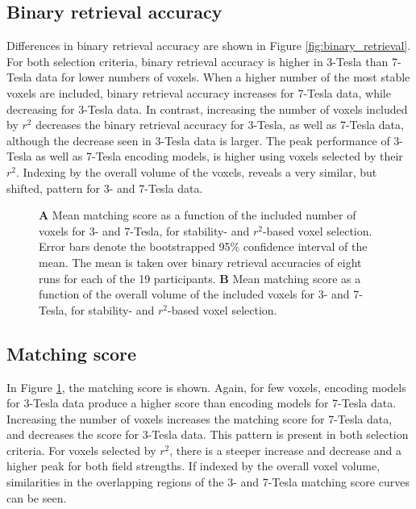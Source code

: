 \subsection*{Binary retrieval accuracy}

Differences in binary retrieval accuracy are shown in Figure \ref{fig:binary_retrieval}. For both selection criteria, binary retrieval
accuracy is higher in 3-Tesla than 7-Tesla data for lower numbers of voxels.
When a higher number of the most stable voxels are included, binary retrieval accuracy increases for 7-Tesla data, while decreasing for 3-Tesla data.    
In contrast, increasing the number of voxels included by $r^2$ decreases the
binary retrieval accuracy for 3-Tesla, as well as 7-Tesla data, although the
decrease seen in 3-Tesla data is larger. The peak
performance of 3-Tesla as well as 7-Tesla encoding models, is higher using
voxels selected by their $r^2$.
Indexing by the overall volume of the voxels, reveals a very similar, but
shifted, pattern for 3- and 7-Tesla data.

\begin{figure}
  \centering
  \def\svgwidth{\linewidth}
  
	
  \caption{\textbf{A} Mean matching score as a function of the included number of
  voxels for 3- and 7-Tesla, for stability- and $r^2$-based voxel selection. Error bars denote the bootstrapped 95\% confidence
  interval of the mean. The mean is taken over binary retrieval accuracies of
  eight runs for each of the 19 participants. \textbf{B} Mean matching score as a function of the overall volume of
	  the included voxels for 3- and 7-Tesla, for stability- and $r^2$-based voxel selection.}

 \label{fig:matching_score}
\end{figure}

\subsection*{Matching score}

In Figure \ref{fig:matching_score}, the matching score is shown. Again, for
few voxels, encoding models for 3-Tesla data produce a higher score than encoding
models for 7-Tesla data. Increasing the number of voxels increases the matching
score for 7-Tesla data, and decreases the score for 3-Tesla data. This pattern
is present in both selection criteria. For voxels selected by $r^2$, there is a
steeper increase and decrease and a higher peak for both field strengths.
If indexed by the overall voxel volume, similarities in the overlapping regions
of the 3- and 7-Tesla matching score curves can be seen.


